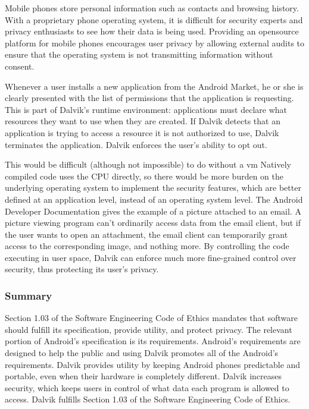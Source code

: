 \documentclass[11pt]{article}
\begin{document}
\begin{multicols}{2}
Mobile phones store personal information such as contacts and browsing history.
With a proprietary phone operating system, it is difficult for security experts
and privacy enthusiasts to see how their data is being used.  Providing an
\gls{opensource} platform for mobile phones encourages user privacy by allowing
external audits to ensure that the operating system is not transmitting
information without consent.

Whenever a user installs a new application from the Android Market, he or she is
clearly presented with the list of permissions that the application is
requesting. \cite[Security Architecture]{android-dev-security} This is part of
Dalvik's runtime environment: applications must declare what resources they want
to use when they are created.  If Dalvik detects that an application is trying
to access a resource it is not authorized to use, Dalvik terminates the
application.  \cite[Using Permissions]{android-dev-security} Dalvik enforces the
user's ability to opt out.

This would be difficult (although not impossible) to do without a \gls{vm}
Natively compiled code uses the CPU directly, so there would be more burden on
the underlying operating system to implement the security features, which are
better defined at an application level, instead of an operating system level.
The Android Developer Documentation gives the example of a picture attached to
an email. \cite[URI Permissions]{android-dev-security}  A picture viewing
program can't ordinarily access data from the email client, but if the user
wants to open an attachment, the email client can temporarily grant access to
the corresponding image, and nothing more.  By controlling the code executing in
user space, Dalvik can enforce much more fine-grained control over security,
thus protecting its user's privacy.


\subsubsection{Summary} %
\label{ssub:public-summary}

Section 1.03 of the Software Engineering Code of Ethics mandates that software
should fulfill its specification, provide utility, and protect privacy.  The
relevant portion of Android's specification is its requirements.  Android's
requirements are designed to help the public and using Dalvik promotes all of
the Android's requirements.  Dalvik provides utility by keeping Android phones
predictable and portable, even when their hardware is completely different.
Dalvik increases security, which keeps users in control of what data each
program is allowed to access.  Dalvik fulfills Section 1.03 of the Software
Engineering Code of Ethics.


\end{multicols}
\end{document}
